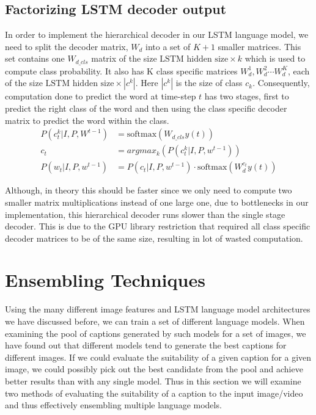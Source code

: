 \subsection{Factorizing LSTM decoder output}
In order to implement the hierarchical decoder in our LSTM language model, we
need to split the decoder matrix, $W_d$ into a set of $K+1$ smaller matrices.
This set contains one $W_{d\_cls}$  matrix of the size $\text{LSTM hidden size}
\times k$
which is used to compute class probability.
It also has K class specific matrices ${W_{d}^{1},W_{d}^{2}\cdots W_{d}^{K}}$,
each of the size $\text{LSTM hidden size}\times |c^k|$.
Here $|c^k|$ is the size of class $c_k$.
Consequently, computation done to predict the word at time-step $t$ has two
stages, first to predict the right class of the word and then using the class
specific decoder matrix to predict the word within the class.
\begin{align}
        \label{eq:classLStmdecoder}
        P(c_{t}^{k}| I,P, W^{t-1}) &= \text{softmax}(W_{d\_cls} y(t)) \\
        c_t &= argmax_k\left(P(c_{t}^k| I,P, w^{t-1})\right) \\
        P(w_t | I,P, w^{t-1}) &= P(c_t| I,P, w^{t-1}) \cdot \text{softmax}(W_{d}^{c_t} y(t))
\end{align}

Although, in theory this should be faster since we only need to compute two
smaller matrix multiplications instead of one large one, due to bottlenecks in
our implementation, this hierarchical decoder runs slower than the single stage
decoder.
This is due to the GPU library restriction that required all class specific
decoder matrices to be of the same size, resulting in lot of wasted computation.
\section{Ensembling Techniques}
Using the many different image features and LSTM language model architectures we
have discussed before, we can train a set of different language models.
When examining the pool of captions generated by such models for a set of
images, we have found out that different models tend to generate the best
captions for different images.
If we could evaluate the suitability of a given caption for a given image, we
could possibly pick out the best candidate from the pool and achieve better
results than with any single model.
Thus in this section we will examine two methods of evaluating the suitability
of a caption to the input image/video and thus effectively ensembling multiple
language models.

